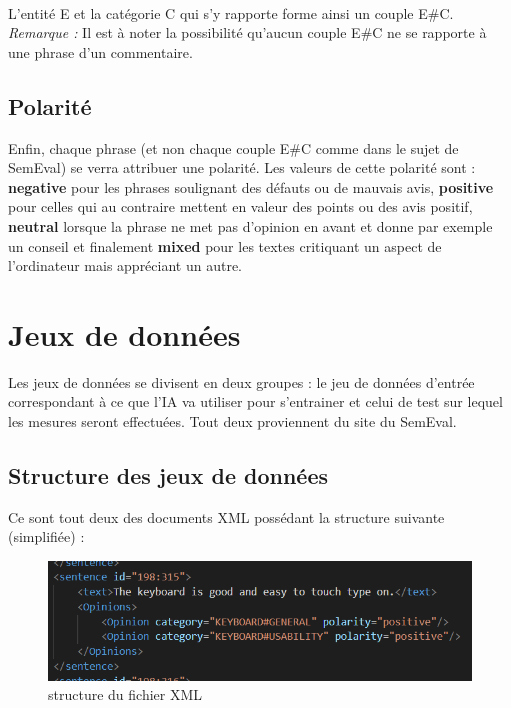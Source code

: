 \documentclass[12pt ,a4paper ]{article}
\begin{document}
\begin{multicols}{2}
\paragraph{} 
\noindent L'entité E et la catégorie C qui s'y rapporte forme ainsi un couple E\#C. \\

\noindent\textit{Remarque : }Il est à noter la possibilité qu'aucun couple E\#C ne se rapporte à une phrase d'un commentaire.

\subsection{Polarité}
Enfin, chaque phrase (et non chaque couple E\#C comme dans le sujet de SemEval) se verra attribuer une polarité. Les valeurs de cette polarité sont : \textbf{negative} pour les phrases soulignant des défauts ou de mauvais avis, \textbf{positive} pour celles qui au contraire mettent en valeur des points ou des avis positif, \textbf{neutral} lorsque la phrase ne met pas d'opinion en avant et donne par exemple un conseil et finalement \textbf{mixed} pour les textes critiquant un aspect de l'ordinateur mais appréciant un autre. 

\section{Jeux de données}
Les jeux de données se divisent en deux groupes : le jeu de données d'entrée correspondant à ce que l'IA va utiliser pour s'entrainer et celui de test sur lequel les mesures seront effectuées. Tout deux proviennent du site du SemEval. 

\subsection{Structure des jeux de données}
\noindent Ce sont tout deux des documents XML possédant la structure suivante (simplifiée) :  

\begin{figure}[H]
\begin{center}
\includegraphics[scale=0.55]{xml_struct.png}
\caption{\small{structure du fichier XML}}
\end{center}
\end{figure}


\end{multicols}
\end{document}

